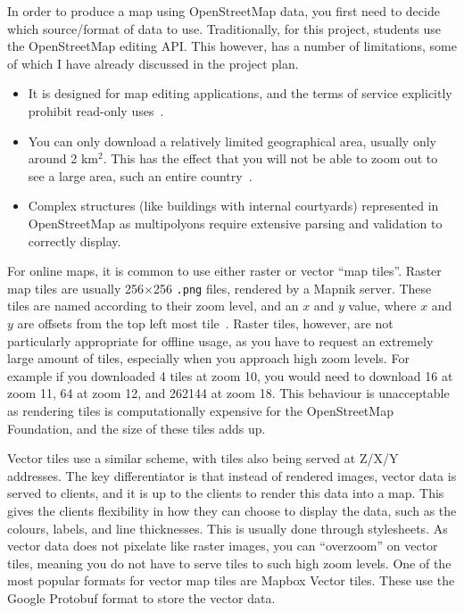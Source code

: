 In order to produce a map using OpenStreetMap data, you first need to decide which source/format of data to use. Traditionally, for this project, students use the OpenStreetMap editing API\@. This however, has a number of limitations, some of which I have already discussed in the project plan.

\begin{itemize}
    \item It is designed for map editing applications, and the terms of service explicitly prohibit read-only uses~\cite{osm-owg-tile-usage-policy}.
    \item You can only download a relatively limited geographical area, usually only around 2 km\(^2\). This has the effect that you will not be able to zoom out to see a large area, such an entire country~\cite{osm-wiki-limited-area}.
    \item Complex structures (like buildings with internal courtyards) represented in OpenStreetMap as multipolyons require extensive parsing and validation to correctly display.
\end{itemize}

For online maps, it is common to use either raster or vector ``map tiles''. Raster map tiles are usually 256\(\times{}\)256 \texttt{.png} files, rendered by a Mapnik server. These tiles are named according to their zoom level, and an \(x\) and \(y\) value, where \(x\) and \(y\) are offsets from the top left most tile~\cite{osm-wiki-tile-names}. Raster tiles, however, are not particularly appropriate for offline usage, as you have to request an extremely large amount of tiles, especially when you approach high zoom levels. For example if you downloaded 4 tiles at zoom 10, you would need to download 16 at zoom 11, 64 at zoom 12, and 262144 at zoom 18. This behaviour is unacceptable as rendering tiles is computationally expensive for the OpenStreetMap Foundation, and the size of these tiles adds up.

Vector tiles use a similar scheme, with tiles also being served at Z/X/Y addresses. The key differentiator is that instead of rendered images, vector data is served to clients, and it is up to the clients to render this data into a map. This gives the clients flexibility in how they can choose to display the data, such as the colours, labels, and line thicknesses. This is usually done through stylesheets. As vector data does not pixelate like raster images, you can ``overzoom'' on vector tiles, meaning you do not have to serve tiles to such high zoom levels. One of the most popular formats for vector map tiles are Mapbox Vector tiles. These use the Google Protobuf format to store the vector data.

